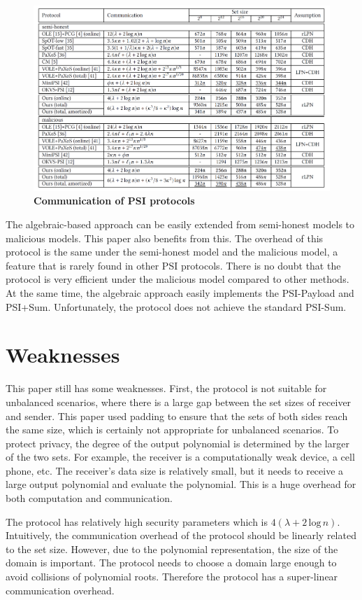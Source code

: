 \documentclass{source/Paper}
\begin{document}
    \begin{figure}[H]
        \centering
        \includegraphics[width=0.8\linewidth]{pic/perform.png}
        \caption{\textbf{Communication of PSI protocols}}
        \label{f1}
    \end{figure}

    The algebraic-based approach can be easily extended from semi-honest models to malicious models. This paper also benefits from this. The overhead of this protocol is the same under the semi-honest model and the malicious model, a feature that is rarely found in other PSI protocols. There is no doubt that the protocol is very efficient under the malicious model compared to other methods. At the same time, the algebraic approach easily implements the PSI-Payload and PSI+Sum. Unfortunately, the protocol does not achieve the standard PSI-Sum.

    \section{Weaknesses}

    This paper still has some weaknesses. First, the protocol is not suitable for unbalanced scenarios, where there is a large gap between the set sizes of receiver and sender. 
    This paper used padding to ensure that the sets of both sides reach the same size, which is certainly not appropriate for unbalanced scenarios. To protect privacy, the degree of the output polynomial is determined by the larger of the two sets. For example, the receiver is a computationally weak device, a cell phone, etc. The receiver's data size is relatively small, but it needs to receive a large output polynomial and evaluate the polynomial. This is a huge overhead for both computation and communication. 

    The protocol has relatively high security parameters which is $4(\lambda + 2\, \mathrm{log}\, n)$. Intuitively, the communication overhead of the protocol should be linearly related to the set size. However, due to the polynomial representation, the size of the domain is important. The protocol needs to choose a domain large enough to avoid collisions of polynomial roots. 
    Therefore the protocol has a super-linear communication overhead. 
\end{document}
